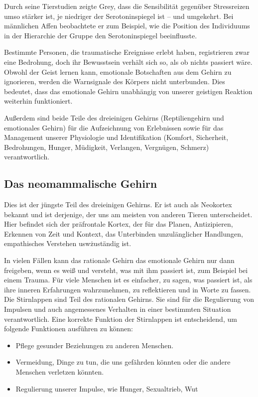 \documentclass[
    invert-title=false,
    titlepage=true,
    titleimage-ratio=1011,
    parskip=half-,
]{bfhpub}                %
\begin{document}
    Durch seine Tierstudien zeigte Grey, dass die Sensibilität gegenüber Stressreizen umso stärker ist, je niedriger der Serotoninspiegel ist – und umgekehrt.
    Bei männlichen Affen beobachtete er zum Beispiel, wie die Position des Individuums in der Hierarchie der Gruppe den Serotoninspiegel beeinflusste.

    Bestimmte Personen, die traumatische Ereignisse erlebt haben, registrieren zwar eine Bedrohung, doch ihr Bewusstsein verhält sich so, als ob nichts passiert wäre.
    Obwohl der Geist lernen kann, emotionale Botschaften aus dem Gehirn zu ignorieren, werden die Warnsignale des Körpers nicht unterbunden.
    Dies bedeutet, dass das emotionale Gehirn unabhängig von unserer geistigen Reaktion weiterhin funktioniert.

    Außerdem sind beide Teile des dreieinigen Gehirns (Reptiliengehirn und emotionales Gehirn) für die Aufzeichnung von Erlebnissen sowie für das Management unserer Physiologie und Identifikation (Komfort, Sicherheit, Bedrohungen, Hunger, Müdigkeit, Verlangen, Vergnügen, Schmerz) verantwortlich.

    \subsection{Das neomammalische Gehirn}\label{subsec:das-neomammalische-gehirn}
    Dies ist der jüngste Teil des dreieinigen Gehirns.
    Er ist auch als Neokortex bekannt und ist derjenige, der uns am meisten von anderen Tieren unterscheidet.
    Hier befindet sich der präfrontale Kortex, der für das Planen, Antizipieren, Erkennen von Zeit und Kontext, das Unterbinden unzulänglicher Handlungen, empathisches Verstehen usw\. zuständig ist.

    In vielen Fällen kann das rationale Gehirn das emotionale Gehirn nur dann freigeben, wenn es weiß und versteht, was mit ihm passiert ist, zum Beispiel bei einem Trauma.
    Für viele Menschen ist es einfacher, zu sagen, was passiert ist, als ihre inneren Erfahrungen wahrzunehmen, zu reflektieren und in Worte zu fassen.
    Die Stirnlappen sind Teil des rationalen Gehirns.
    Sie sind für die Regulierung von Impulsen und auch angemessenes Verhalten in einer bestimmten Situation verantwortlich.
    Eine korrekte Funktion der Stirnlappen ist entscheidend, um folgende Funktionen ausführen zu können:
    \begin{itemize}
        \item Pflege gesunder Beziehungen zu anderen Menschen.
        \item Vermeidung, Dinge zu tun, die uns gefährden könnten oder die andere Menschen verletzen könnten.
        \item Regulierung unserer Impulse, wie Hunger, Sexualtrieb, Wut
    \end{itemize}
\end{document}
